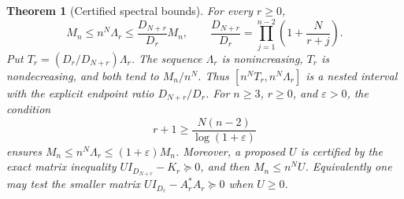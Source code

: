 \documentclass[11pt]{article}
\newtheorem{theorem}{Theorem}[section]
\theoremstyle{remark}
\numberwithin{equation}{section}
\begin{document}
\begin{theorem}[Certified spectral bounds]\label{thm:spectral-hierarchy}
For every $r\ge0$,
\begin{equation}\label{eq:spectral-bounds}
 M_n\le n^N\Lambda_r
 \le\frac{D_{N+r}}{D_r}M_n,
 \qquad
 \frac{D_{N+r}}{D_r}
 =\prod_{j=1}^{n-2}\left(1+\frac{N}{r+j}\right).
\end{equation}
Put $T_r=(D_r/D_{N+r})\Lambda_r$. The sequence $\Lambda_r$ is
nonincreasing, $T_r$ is nondecreasing, and both tend to $M_n/n^N$.
Thus $[n^NT_r,n^N\Lambda_r]$ is a nested interval with the explicit
endpoint ratio $D_{N+r}/D_r$.
For $n\ge3$, $r\ge0$, and $\varepsilon>0$, the condition
\[
 r+1\ge\frac{N(n-2)}{\log(1+\varepsilon)}
\]
ensures $M_n\le n^N\Lambda_r\le(1+\varepsilon)M_n$.
Moreover, a proposed $U$ is certified by the exact matrix inequality
$UI_{D_{N+r}}-K_r\succeq0$, and then $M_n\le n^NU$.
Equivalently one may test the smaller matrix
$UI_{D_r}-A_r^*A_r\succeq0$ when $U\ge0$.
\end{theorem}
\end{document}
